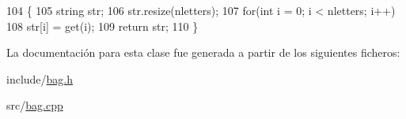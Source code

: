 \begin{DoxyCode}
104                            \{
105     \textcolor{keywordtype}{string} str;
106     str.resize(nletters);
107     \textcolor{keywordflow}{for}(\textcolor{keywordtype}{int} i = 0; i < nletters; i++)
108         str[i] = \textcolor{keyword}{get}(i);
109     \textcolor{keywordflow}{return} str;
110 \}
\end{DoxyCode}


La documentación para esta clase fue generada a partir de los siguientes ficheros\+:\begin{DoxyCompactItemize}
\item 
include/\hyperlink{bag_8h}{bag.\+h}\item 
src/\hyperlink{bag_8cpp}{bag.\+cpp}\end{DoxyCompactItemize}
